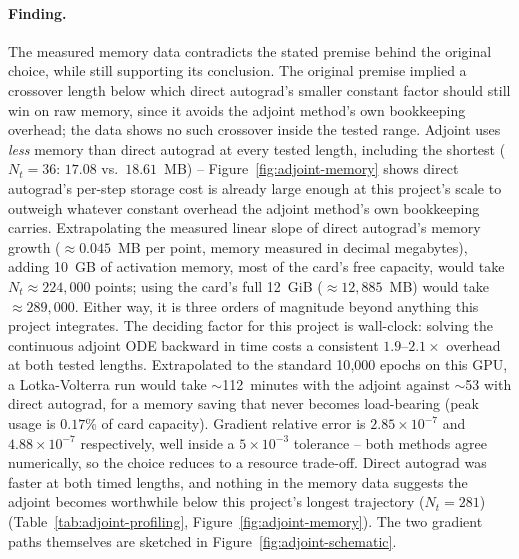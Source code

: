 \paragraph{Finding.} The measured memory data contradicts the stated
premise behind the original choice, while still supporting its conclusion.
The original premise implied a crossover length below which direct autograd's smaller constant factor
should still win on raw memory, since it avoids the adjoint method's own
bookkeeping overhead; the data shows no such crossover inside the tested
range. Adjoint uses \emph{less} memory than direct autograd at every tested
length, including the shortest ($N_t=36$: $17.08$ vs.\ $18.61$~MB) --
Figure~\ref{fig:adjoint-memory} shows direct autograd's per-step storage cost
is already large enough at this project's scale to outweigh whatever
constant overhead the adjoint method's own bookkeeping carries.
Extrapolating the measured linear slope of direct autograd's memory growth
($\approx0.045$~MB per point, memory measured in decimal megabytes), adding
10~GB of activation memory, most of the card's free capacity, would take
$N_t\approx224{,}000$ points; using the card's full 12~GiB ($\approx12{,}885$~MB)
would take $\approx289{,}000$. Either way, it is three orders of magnitude
beyond anything this project integrates. The deciding factor for this project
is wall-clock: solving the continuous adjoint ODE backward in time costs a
consistent $1.9$--$2.1\times$ overhead at both tested lengths. Extrapolated to
the standard 10{,}000 epochs on this GPU, a Lotka-Volterra run would take
$\sim$112~minutes with the adjoint against $\sim$53 with direct autograd, for
a memory saving that never becomes load-bearing (peak usage is $0.17\%$ of
card capacity). Gradient relative error is $2.85\times10^{-7}$ and
$4.88\times10^{-7}$ respectively, well inside a $5\times10^{-3}$ tolerance --
both methods agree numerically, so the choice reduces to a resource
trade-off. Direct autograd was faster at both timed lengths, and nothing in
the memory data suggests the adjoint becomes worthwhile below this project's
longest trajectory ($N_t=281$) (Table~\ref{tab:adjoint-profiling},
Figure~\ref{fig:adjoint-memory}). The two
gradient paths themselves are sketched in Figure~\ref{fig:adjoint-schematic}.

\FloatBarrier

